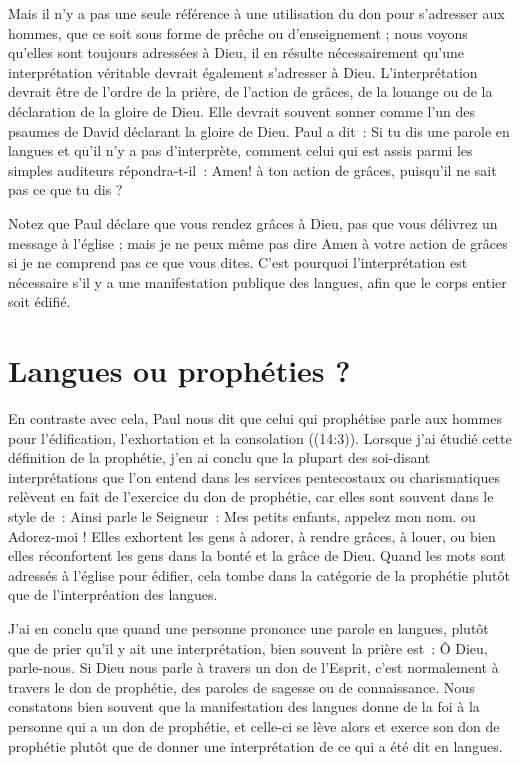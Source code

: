 Mais il n'y a pas une seule référence à une utilisation du don
 pour s'adresser aux hommes, que ce soit sous forme de prêche
 ou d'enseignement ; nous voyons qu'elles sont toujours adressées à Dieu,
 il en résulte nécessairement qu'une interprétation véritable devrait
 également s'adresser à Dieu. L'interprétation devrait être de l'ordre
 de la prière, de l'action de grâces, de la louange ou de la déclaration
 de la gloire de Dieu. Elle devrait souvent sonner comme l'un des psaumes
 de David déclarant la gloire de Dieu. Paul a dit~:
 \og Si tu dis une parole en langues et qu'il n'y a pas d'interprète,
 comment celui qui est assis parmi les simples auditeurs
 répondra-t-il~: Amen! à ton action de grâces, puisqu'il ne sait pas
 ce que tu dis ? \fg{}

Notez que Paul déclare que vous rendez grâces à Dieu, pas que vous délivrez
 un message à l'église ; mais je ne peux même pas dire \og Amen \fg{}
 à votre action de grâces si je ne comprend pas ce que vous dites.
 C'est pourquoi l'interprétation est nécessaire s'il y a une manifestation
 publique des langues, afin que le corps entier soit édifié.


\section{Langues ou proph\'eties ?}

En contraste avec cela, Paul nous dit que celui qui prophétise
 parle aux hommes pour l'édification, l'exhortation et la consolation
 ((14:3)). Lorsque j'ai étudié cette définition
 de la prophétie, j'en ai conclu que la plupart des soi-disant
 interprétations que l'on entend dans les services pentecostaux
 ou charismatiques relèvent en fait de l'exercice du don de prophétie,
 car elles sont souvent dans le style de~: \og Ainsi parle le Seigneur~:
 \og Mes petits enfants, appelez mon nom. \fg{} ou \og Adorez-moi ! \fg{}
 Elles exhortent les gens à adorer, à rendre grâces, à louer,
 ou bien elles réconfortent les gens dans la bonté et la grâce de Dieu.
 Quand les mots sont adressés à l'église pour édifier, cela tombe
 dans la catégorie de la prophétie plutôt que de l'interpréation des langues.
 \nowidow

J'ai en conclu que quand une personne prononce une parole en langues,
 plutôt que de prier qu'il y ait une interprétation, bien souvent
 la prière est~: \og Ô Dieu, parle-nous. \fg{}
 Si Dieu nous parle à travers un don de l'Esprit, c'est normalement
 à travers le don de prophétie, des paroles de sagesse ou de connaissance.
 Nous constatons bien souvent que la manifestation des langues donne de la foi
 à la personne qui a un don de prophétie, et celle-ci se lève alors et exerce son don
 de prophétie plutôt que de donner une interprétation de ce qui a été dit
 en langues.

